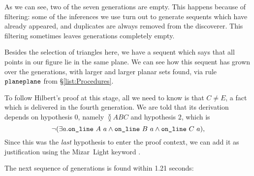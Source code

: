 \linebreak

As we can see, two of the seven generations are empty. This happens because of filtering: some of the inferences we use turn out to generate sequents which have already appeared, and duplicates are always removed from the discoverer. This filtering sometimes leaves generations completely empty. 

Besides the selection of triangles here, we have a sequent which says that all points in our figure lie in the same plane. We can see how this sequent has grown over the generations, with larger and larger planar sets found, via rule~$\texttt{planeplane}$ from \S\ref{list:Procedures}. 

To follow Hilbert's proof at this stage, all we need to know is that $C\neq E$, a fact which is delivered in the fourth generation. We are told that its derivation depends on hypothesis $0$, namely $\between{A}{B}{C}$ and hypothesis $2$, which is 
\begin{displaymath}
\neg(\exists a.\texttt{on\_line}\ A\ a\wedge \texttt{on\_line}\ B\ a\wedge \texttt{on\_line}\ C\ a),
\end{displaymath}
Since this was the \emph{last} hypothesis to enter the proof context, we can add it as justification using the Mizar~Light keyword .

\linebreak

The next sequence of generations is found within 1.21 seconds:

